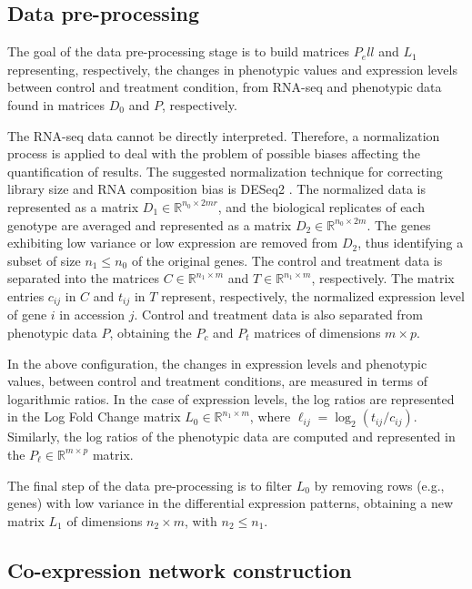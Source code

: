 \subsection{Data pre-processing}
The goal of the data pre-processing stage is to build matrices $P_ell$ and $L_1$ representing, respectively, the changes in phenotypic values and expression levels between control and treatment condition, from RNA-seq and phenotypic data found in matrices $D_0$ and $P$, respectively.

The RNA-seq data cannot be directly interpreted. Therefore, a normalization process is applied to deal with the problem of possible biases affecting the quantification of results. The suggested normalization technique for correcting library size and RNA composition bias is DESeq2 \cite{love2014moderated}. The normalized data is represented as a matrix $D_1 \in \mathbb{R}^{n_0 \times 2mr}$, and the biological replicates of each genotype are averaged and represented as a matrix $D_2 \in \mathbb{R}^{n_0 \times 2m}$. The genes exhibiting low variance or low expression are removed from $D_2$, thus identifying a subset of size $n_1 \leq n_0$ of the original genes. The control and treatment data is separated into the matrices $C\in \mathbb{R}^{n_1 \times m}$ and $T\in \mathbb{R}^{n_1 \times m}$, respectively. The matrix entries $c_{ij}$ in $C$ and $t_{ij}$ in $T$ represent, respectively, the normalized expression level of gene $i$ in accession $j$. Control and treatment data is also separated from phenotypic data $P$, obtaining the $P_c$ and $P_t$ matrices of dimensions $m \times p$.

In the above configuration, the changes in expression levels and phenotypic values, between control and treatment conditions, are measured in terms of logarithmic ratios. In the case of expression levels, the log ratios are represented in the Log Fold Change matrix $L_0 \in \mathbb{R}^{n_1 \times m}$, where $\ell_{ij}=\log_2 (t_{ij}/c_{ij})$. Similarly, the log ratios of the phenotypic data are computed and represented in the $P_\ell \in \mathbb{R}^{m \times p}$ matrix.

The final step of the data pre-processing is to filter $L_0$ by removing rows (e.g., genes) with low variance in the differential expression patterns, obtaining a new matrix $L_1$ of dimensions $n_2 \times m$, with $n_2 \leq n_1$.

\subsection{Co-expression network construction}

